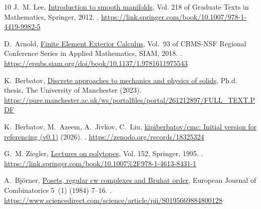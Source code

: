\documentclass{elsarticle}
\theoremstyle{definition}
\begin{document}
\begin{thebibliography}{10}
J.~M. Lee,
  \href{https://link.springer.com/book/10.1007/978-1-4419-9982-5}{Introduction
  to smooth manifolds}, Vol. 218 of Graduate Texts in Mathematics, Springer,
  2012.
\newblock \href {https://doi.org/https://doi.org/10.1007/978-1-4419-9982-5}
  {}.
\newline\urlprefix\url{https://link.springer.com/book/10.1007/978-1-4419-9982-5}

D.~Arnold,
  \href{https://epubs.siam.org/doi/book/10.1137/1.9781611975543}{Finite Element
  Exterior Calculus}, Vol.~93 of CBMS-NSF Regional Conference Series in Applied
  Mathematics, SIAM, 2018.
\newblock \href {https://doi.org/10.1137/1.9781611975543}
  {}.
\newline\urlprefix\url{https://epubs.siam.org/doi/book/10.1137/1.9781611975543}

K.~Berbatov,
  \href{https://pure.manchester.ac.uk/ws/portalfiles/portal/261212897/FULL_TEXT.PDF}{Discrete
  approaches to mechanics and physics of solids}, Ph.d. thesis, The University
  of Manchester (2023).
\newline\urlprefix\url{https://pure.manchester.ac.uk/ws/portalfiles/portal/261212897/FULL_TEXT.PDF}

K.~Berbatov, M.~Azeem, A.~Jivkov, C.~Liu,
  \href{https://zenodo.org/records/18325324}{kipiberbatov/cmc: Initial version
  for referencing (v0.1)} (2026).
\newblock \href {https://doi.org/10.5281/zenodo.18325324}
  {}.
\newline\urlprefix\url{https://zenodo.org/records/18325324}

G.~M. Ziegler,
  \href{https://link.springer.com/book/10.1007%2F978-1-4613-8431-1}{Lectures on
  polytopes}, Vol. 152, Springer, 1995.
\newblock \href {https://doi.org/https://doi.org/10.1007/978-1-4613-8431-1}
  {}.
\newline\urlprefix\url{https://link.springer.com/book/10.1007%2F978-1-4613-8431-1}

A.~Bj{\"o}rner,
  \href{https://www.sciencedirect.com/science/article/pii/S0195669884800128}{Posets,
  regular cw complexes and {Bruhat} order}, European Journal of Combinatorics
  5~(1) (1984) 7--16.
\newblock \href {https://doi.org/10.1016/S0195-6698(84)80012-8}
  {}.
\newline\urlprefix\url{https://www.sciencedirect.com/science/article/pii/S0195669884800128}


\end{thebibliography}
\end{document}
